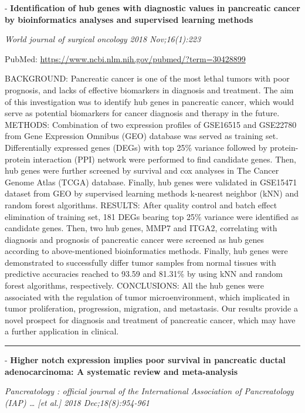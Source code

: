 \documentclass[]{article}
\begin{document}
 - \textbf{Identification of hub genes with diagnostic values in
pancreatic cancer by bioinformatics analyses and supervised learning
methods}

\emph{World journal of surgical oncology 2018 Nov;16(1):223}

PubMed: \url{https://www.ncbi.nlm.nih.gov/pubmed/?term=30428899}

BACKGROUND: Pancreatic cancer is one of the most lethal tumors with poor
prognosis, and lacks of effective biomarkers in diagnosis and treatment.
The aim of this investigation was to identify hub genes in pancreatic
cancer, which would serve as potential biomarkers for cancer diagnosis
and therapy in the future. METHODS: Combination of two expression
profiles of GSE16515 and GSE22780 from Gene Expression Omnibus (GEO)
database was served as training set. Differentially expressed genes
(DEGs) with top 25\% variance followed by protein-protein interaction
(PPI) network were performed to find candidate genes. Then, hub genes
were further screened by survival and cox analyses in The Cancer Genome
Atlas (TCGA) database. Finally, hub genes were validated in GSE15471
dataset from GEO by supervised learning methods k-nearest neighbor (kNN)
and random forest algorithms. RESULTS: After quality control and batch
effect elimination of training set, 181 DEGs bearing top 25\% variance
were identified as candidate genes. Then, two hub genes, MMP7 and ITGA2,
correlating with diagnosis and prognosis of pancreatic cancer were
screened as hub genes according to above-mentioned bioinformatics
methods. Finally, hub genes were demonstrated to successfully differ
tumor samples from normal tissues with predictive accuracies reached to
93.59 and 81.31\% by using kNN and random forest algorithms,
respectively. CONCLUSIONS: All the hub genes were associated with the
regulation of tumor microenvironment, which implicated in tumor
proliferation, progression, migration, and metastasis. Our results
provide a novel prospect for diagnosis and treatment of pancreatic
cancer, which may have a further application in clinical.

{}

{}

\begin{center}\rule{0.5\linewidth}{\linethickness}\end{center}

 - \textbf{Higher notch expression implies poor survival in pancreatic
ductal adenocarcinoma: A systematic review and meta-analysis}

\emph{Pancreatology : official journal of the International Association
of Pancreatology (IAP) \ldots{} {[}et al.{]} 2018 Dec;18(8):954-961}
\end{document}
